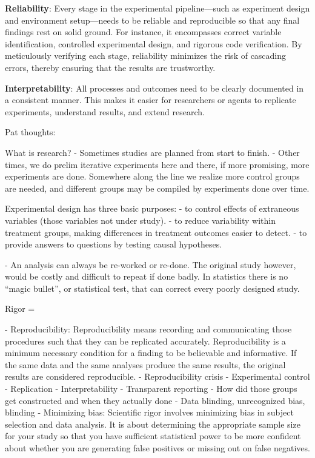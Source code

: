 \noindent\textbf{Reliability}:  
Every stage in the experimental pipeline—such as experiment design and environment setup—needs to be reliable and reproducible so that any final findings rest on solid ground.
For instance, it encompasses correct variable identification, controlled experimental design, and rigorous code verification.
By meticulously verifying each stage, reliability minimizes the risk of cascading errors, thereby ensuring that the results are trustworthy.

\noindent\textbf{Interpretability}: All processes and outcomes need to be clearly documented in a consistent manner. This makes it easier for researchers or agents to replicate experiments, understand results, and extend research. 

Pat thoughts:

What is research?
- Sometimes studies are planned from start to finish. 
- Other times, we do prelim iterative experiments here and there, if more promising, more experiments are done. Somewhere along the line we realize more control groups are needed, and different groups may be compiled by experiments done over time. 

Experimental design has three basic purposes:
- to control effects of extraneous variables (those variables not under study).
- to reduce variability within treatment groups, making differences in treatment outcomes easier to detect.
- to provide answers to questions by testing causal hypotheses.

- An analysis can always be re-worked or re-done. The original study however, would be costly and difficult to repeat if done badly. In statistics there is no “magic bullet”, or statistical test, that can correct every poorly designed study.


Rigor = 

- Reproducibility: Reproducibility means recording and communicating those procedures such that they can be replicated accurately. Reproducibility is a minimum necessary condition for a finding to be believable and informative. If the same data and the same analyses produce the same results, the original results are considered reproducible.
    - Reproducibility crisis
- Experimental control 
- Replication 
- Interpretability
    - Transparent reporting
    - How did those groups get constructed and when they actually done
- Data blinding, unrecognized bias, blinding
- Minimizing bias: Scientific rigor involves minimizing bias in subject selection and data analysis. It is about determining the appropriate sample size for your study so that you have sufficient statistical power to be more confident about whether you are generating false positives or missing out on false negatives.

